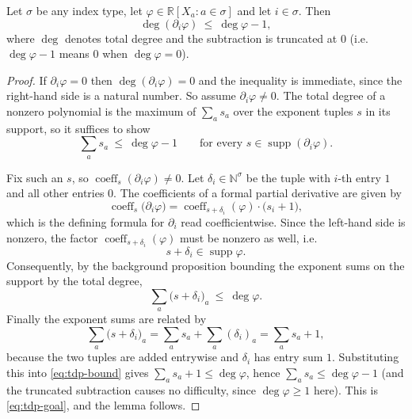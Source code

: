 \begin{lemma}
Let $\sigma$ be any index type, let $\varphi\in\mathbb{R}[X_a:a\in\sigma]$ and
let $i\in\sigma$. Then
\[
  \deg(\partial_i\varphi)\ \le\ \deg\varphi-1,
\]
where $\deg$ denotes total degree and the subtraction is truncated at $0$
(i.e. $\deg\varphi-1$ means $0$ when $\deg\varphi=0$).
\end{lemma}
\begin{proof}
If $\partial_i\varphi=0$ then $\deg(\partial_i\varphi)=0$ and the inequality is
immediate, since the right-hand side is a natural number. So assume
$\partial_i\varphi\ne0$. The total degree of a nonzero polynomial is the maximum
of $\sum_a s_a$ over the exponent tuples $s$ in its support, so it suffices to
show
\begin{equation}\label{eq:tdp-goal}
  \sum_a s_a\ \le\ \deg\varphi-1
  \qquad\text{for every }s\in\operatorname{supp}(\partial_i\varphi).
\end{equation}

Fix such an $s$, so $\operatorname{coeff}_s(\partial_i\varphi)\ne0$. Let
$\delta_i\in\mathbb{N}^{\sigma}$ be the tuple with $i$-th entry $1$ and all
other entries $0$. The coefficients of a formal partial derivative are given by
\[
  \operatorname{coeff}_s\bigl(\partial_i\varphi\bigr)
  =\operatorname{coeff}_{s+\delta_i}(\varphi)\cdot\bigl(s_i+1\bigr),
\]
which is the defining formula for $\partial_i$ read coefficientwise. Since the
left-hand side is nonzero, the factor $\operatorname{coeff}_{s+\delta_i}(\varphi)$
must be nonzero as well, i.e.
\[
  s+\delta_i\in\operatorname{supp}\varphi .
\]
Consequently, by the background proposition bounding the exponent sums on the
support by the total degree,
\begin{equation}\label{eq:tdp-bound}
  \sum_a\bigl(s+\delta_i\bigr)_a\ \le\ \deg\varphi .
\end{equation}
Finally the exponent sums are related by
\[
  \sum_a\bigl(s+\delta_i\bigr)_a=\sum_a s_a+\sum_a(\delta_i)_a=\sum_a s_a+1,
\]
because the two tuples are added entrywise and $\delta_i$ has entry sum $1$.
Substituting this into \eqref{eq:tdp-bound} gives
$\sum_a s_a+1\le\deg\varphi$, hence $\sum_a s_a\le\deg\varphi-1$ (and the
truncated subtraction causes no difficulty, since $\deg\varphi\ge1$ here). This
is \eqref{eq:tdp-goal}, and the lemma follows.
\end{proof}
